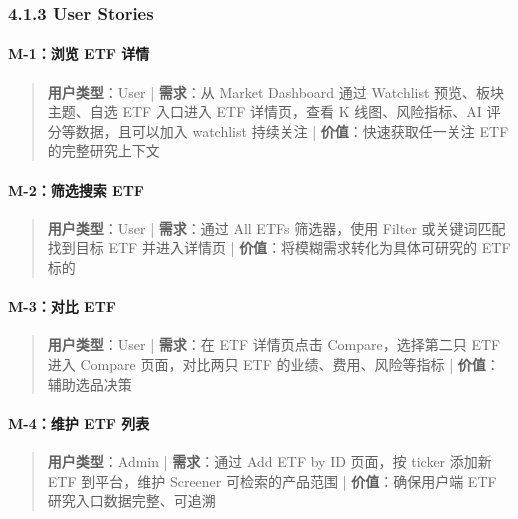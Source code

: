 \subsubsection{4.1.3 User Stories}

\paragraph{M-1：浏览 ETF 详情}

\begin{quote}\small \textbf{用户类型}：User | \textbf{需求}：从 Market Dashboard 通过 Watchlist 预览、板块主题、自选 ETF 入口进入 ETF 详情页，查看 K 线图、风险指标、AI 评分等数据，且可以加入 watchlist 持续关注 | \textbf{价值}：快速获取任一关注 ETF 的完整研究上下文\end{quote}


\paragraph{M-2：筛选搜索 ETF}

\begin{quote}\small \textbf{用户类型}：User | \textbf{需求}：通过 All ETFs 筛选器，使用 Filter 或关键词匹配找到目标 ETF 并进入详情页 | \textbf{价值}：将模糊需求转化为具体可研究的 ETF 标的\end{quote}


\paragraph{M-3：对比 ETF}

\begin{quote}\small \textbf{用户类型}：User | \textbf{需求}：在 ETF 详情页点击 Compare，选择第二只 ETF 进入 Compare 页面，对比两只 ETF 的业绩、费用、风险等指标 | \textbf{价值}：辅助选品决策\end{quote}


\paragraph{M-4：维护 ETF 列表}

\begin{quote}\small \textbf{用户类型}：Admin | \textbf{需求}：通过 Add ETF by ID 页面，按 ticker 添加新 ETF 到平台，维护 Screener 可检索的产品范围 | \textbf{价值}：确保用户端 ETF 研究入口数据完整、可追溯\end{quote}

